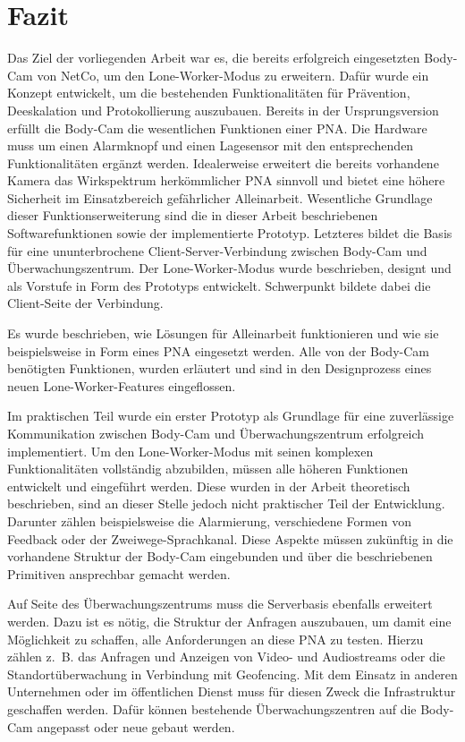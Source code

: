 \documentclass[thesis.tex]{subfiles}
\begin{document}
\chapter{Fazit}\label{chap:fazit}

Das Ziel der vorliegenden Arbeit war es, die bereits erfolgreich eingesetzten Body-Cam von NetCo, um den Lone-Worker-Modus zu erweitern.
Dafür wurde ein Konzept entwickelt, um die bestehenden Funktionalitäten für Prävention, Deeskalation und Protokollierung auszubauen.
Bereits in der Ursprungsversion erfüllt die Body-Cam die wesentlichen Funktionen einer PNA.
Die Hardware muss um einen Alarmknopf und einen Lagesensor mit den entsprechenden Funktionalitäten ergänzt werden.
Idealerweise erweitert die bereits vorhandene Kamera das Wirkspektrum herkömmlicher PNA sinnvoll und bietet eine höhere Sicherheit im Einsatzbereich gefährlicher Alleinarbeit.
Wesentliche Grundlage dieser Funktionserweiterung sind die in dieser Arbeit beschriebenen Softwarefunktionen sowie der implementierte Prototyp.
Letzteres bildet die Basis für eine ununterbrochene Client-Server-Verbindung zwischen Body-Cam und Überwachungszentrum.
Der Lone-Worker-Modus wurde beschrieben, designt und als Vorstufe in Form des Prototyps entwickelt.
Schwerpunkt bildete dabei die Client-Seite der Verbindung.

Es wurde beschrieben, wie Lösungen für Alleinarbeit funktionieren und wie sie beispielsweise in Form eines PNA eingesetzt werden.
Alle von der Body-Cam benötigten Funktionen, wurden erläutert und sind in den Designprozess eines neuen Lone-Worker-Features eingeflossen.

Im praktischen Teil wurde ein erster Prototyp als Grundlage für eine zuverlässige Kommunikation zwischen Body-Cam und Überwachungszentrum erfolgreich implementiert.
Um den Lone-Worker-Modus mit seinen komplexen Funktionalitäten vollständig abzubilden, müssen alle höheren Funktionen entwickelt und eingeführt werden.
Diese wurden in der Arbeit theoretisch beschrieben, sind an dieser Stelle jedoch nicht praktischer Teil der Entwicklung.
Darunter zählen beispielsweise die Alarmierung, verschiedene Formen von Feedback oder der Zweiwege-Sprachkanal.
Diese Aspekte müssen zukünftig in die vorhandene Struktur der Body-Cam eingebunden und über die beschriebenen Primitiven ansprechbar gemacht werden.

Auf Seite des Überwachungszentrums muss die Serverbasis ebenfalls erweitert werden.
Dazu ist es nötig, die Struktur der Anfragen auszubauen, um damit eine Möglichkeit zu schaffen, alle Anforderungen an diese PNA zu testen.
Hierzu zählen z.~B. das Anfragen und Anzeigen von Video- und Audiostreams oder die Standortüberwachung in Verbindung mit Geofencing.
Mit dem Einsatz in anderen Unternehmen oder im öffentlichen Dienst muss für diesen Zweck die Infrastruktur geschaffen werden.
Dafür können bestehende Überwachungszentren auf die Body-Cam angepasst oder neue gebaut werden.
\end{document}
